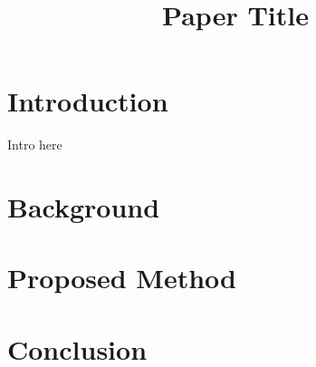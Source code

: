 \documentclass{article}
\title{Paper Title}
\begin{document}
%
\maketitle
%
\begin{abstract}

\end{abstract}

\section{Introduction}
\label{sec:intro}
Intro here


\section{Background}
\label{sec:format}



\section{Proposed Method}
\label{sec:pagestyle}

\section{Conclusion}
\label{sec:format}


\begin{thebibliography}{1}

\end{thebibliography}


\end{document}
